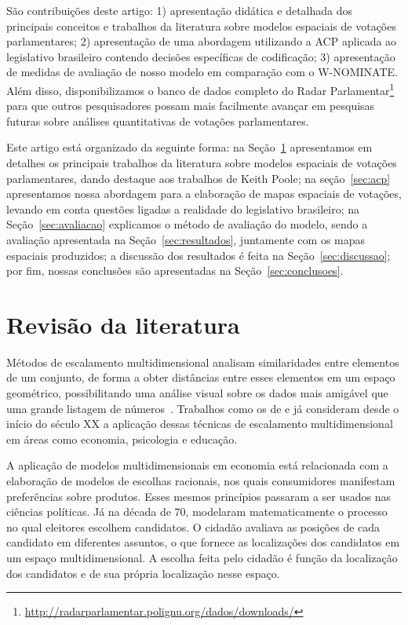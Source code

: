\documentclass[
	article,			%
	12pt,				%
    twoside,			%
	a4paper,			%
	english,			%
	french,				%
	spanish,			%
	brazil,				%
	]{abntex2}
\newcommand\wnominate{W-NOMINATE\xspace}
\begin{document}
São contribuições deste artigo: 1) apresentação didática e detalhada dos principais conceitos e trabalhos da literatura sobre modelos espaciais de votações parlamentares; 2) apresentação de uma abordagem utilizando a ACP aplicada ao legislativo brasileiro contendo decisões específicas de codificação; 3) apresentação de medidas de avaliação de nosso modelo em comparação com o \wnominate.
Além disso, disponibilizamos o banco de dados completo do Radar Parlamentar\footnote{\url{http://radarparlamentar.polignu.org/dados/downloads/}} para que outros pesquisadores possam mais facilmente avançar em pesquisas futuras sobre análises quantitativas de votações parlamentares.

Este artigo está organizado da seguinte forma: na Seção~\ref{sec:revbib} apresentamos em detalhes os principais trabalhos da literatura sobre modelos espaciais de votações parlamentares, dando destaque aos trabalhos de Keith Poole; na seção~\ref{sec:acp} apresentamos nossa abordagem para a elaboração de mapas espaciais de votações, levando em conta questões ligadas a realidade do legislativo brasileiro; na Seção~\ref{sec:avaliacao} explicamos o método de avaliação do modelo, sendo a avaliação apresentada na Seção~\ref{sec:resultados}, juntamente com os mapas espaciais produzidos; a discussão dos resultados é feita na Seção~\ref{sec:discussao}; por fim, nossas conclusões são apresentadas na Seção~\ref{sec:conclusoes}.

\section{Revisão da literatura}
\label{sec:revbib}

Métodos de escalamento multidimensional analisam similaridades entre elementos de um conjunto, de forma a obter distâncias entre esses elementos em um espaço geométrico, possibilitando uma análise visual sobre os dados mais amigável que uma grande listagem de números~\cite{borg2005mds}. Trabalhos como os de  e  já consideram desde o início do século XX a aplicação dessas técnicas de escalamento multidimensional em áreas como economia, psicologia e educação.

A aplicação de modelos multidimensionais em economia está relacionada com a elaboração de modelos de escolhas racionais, nos quais consumidores manifestam preferências sobre produtos. Esses mesmos princípios passaram a ser usados nas ciências políticas. Já na década de 70,  modelaram matematicamente o processo no qual eleitores escolhem candidatos. O cidadão avaliava as posições de cada candidato em diferentes assuntos, o que fornece as localizações dos candidatos em um espaço multidimensional. A escolha feita pelo cidadão é função da localização dos candidatos e de sua própria localização nesse espaço. 
\end{document}
